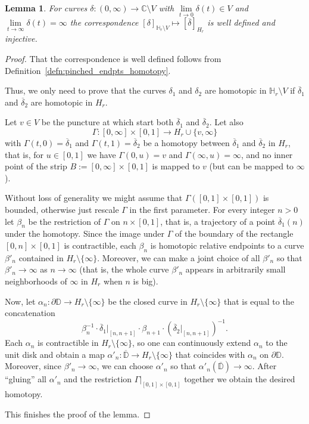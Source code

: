 \documentclass[10pt,reqno,a4paper]{amsart}
\numberwithin{figure}{section}
\numberwithin{equation}{section}
\newtheorem{lmm}[thm]{Lemma}
\begin{document}
\begin{lmm}
	\label{lmm:bar_paths_equivalence}
	For curves $\delta:(0,\infty)\to\mathbb{C}\setminus V$ with $\lim\limits_{t\to 0}\delta(t)\in V$ and $\lim\limits_{t\to \infty}\delta(t)=\infty$ the correspondence $[\delta]_{\mathbb{H}_r\setminus V}\mapsto[\overline{\delta}]_{H_r}$ is well defined and injective.
\end{lmm}
\begin{proof}
	That the correspondence is well defined follows from Definition~\ref{defn:pinched_endpts_homotopy}.
	
	Thus, we only need to prove that the curves $\delta_1$ and $\delta_2$ are homotopic in $\mathbb{H}_r\setminus V$ if $\overline{\delta}_1$ and $\overline{\delta}_2$ are homotopic in $H_r$.
	
	Let $v\in V$ be the puncture at which start both $\overline{\delta}_1$ and $\overline{\delta}_2$. Let also 
	$$\Gamma:[0,\infty]\times[0,1]\to H_r\cup\{v,\infty\}$$
	with $\Gamma(t,0)=\overline{\delta}_1$ and $\Gamma(t,1)=\overline{\delta}_2$ be a homotopy between $\overline{\delta}_1$ and $\overline{\delta}_2$ in $H_r$, that is, for $u\in[0,1]$ we have $\Gamma(0,u)=v$ and $\Gamma(\infty,u)=\infty$, and no inner point of the strip $B:=[0,\infty]\times[0,1]$ is mapped to $v$ (but can be mapped to $\infty$).
	
	Without loss of generality we might assume that $\Gamma([0,1]\times[0,1])$ is bounded, otherwise just rescale $\Gamma$ in the first parameter. For every integer $n>0$ let $\beta_n$ be the restriction of $\Gamma$ on $n\times[0,1]$, that is, a trajectory of a point $\overline{\delta}_1(n)$ under the homotopy. Since the image under $\Gamma$ of the boundary of the rectangle $[0,n]\times[0,1]$ is contractible, each $\beta_n$ is homotopic relative endpoints to a curve $\beta'_n$ contained in $H_r\setminus\{\infty\}$. Moreover, we can make a joint choice of all $\beta'_n$ so that $\beta'_n\to\infty$ as $n\to\infty$ (that is, the whole curve $\beta'_n$ appears in arbitrarily small neighborhoods of $\infty$ in $H_r$ when $n$ is big).
	
	Now, let $\alpha_n:\partial\mathbb{D}\to H_r\setminus\{\infty\}$ be the closed curve in $H_r\setminus\{\infty\}$ that is equal to the concatenation $$\beta_n^{-1}\cdot\overline{\delta}_1|_{[n,n+1]}\cdot\beta_{n+1}\cdot(\overline{\delta}_2|_{[n,n+1]})^{-1}.$$
	Each $\alpha_n$ is contractible in $H_r\setminus\{\infty\}$, so one can continuously extend $\alpha_n$ to the unit disk and obtain a map $\alpha'_n:\overline{\mathbb{D}}\to H_r\setminus\{\infty\}$ that coincides with $\alpha_n$ on $\partial\mathbb{D}$. Moreover, since $\beta'_n\to\infty$, we can choose $\alpha'_n$ so that $\alpha'_n(\overline{\mathbb{D}})\to\infty$. After ``gluing'' all $\alpha'_n$ and the restriction $\Gamma|_{[0,1]\times[0,1]}$ together we obtain the desired homotopy.
	
	This finishes the proof of the lemma.
\end{proof}
\end{document}
